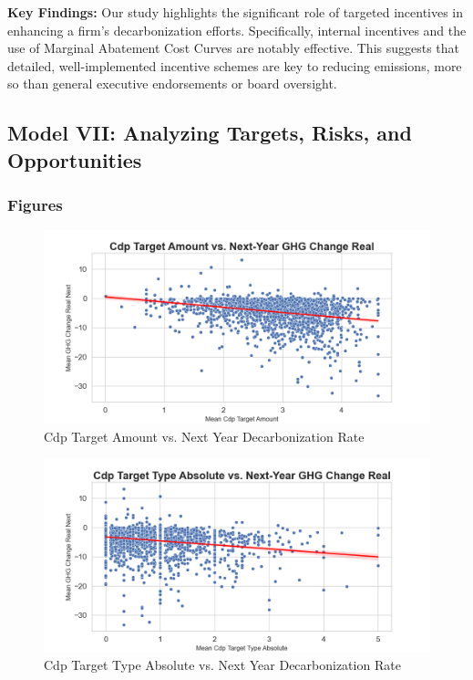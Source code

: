 \textbf{Key Findings:} Our study highlights the significant role of targeted incentives in enhancing a firm's decarbonization efforts. Specifically, internal incentives and the use of Marginal Abatement Cost Curves are notably effective. This suggests that detailed, well-implemented incentive schemes are key to reducing emissions, more so than general executive endorsements or board oversight.




\subsection{Model VII: Analyzing Targets, Risks, and Opportunities}



\subsubsection{Figures}

\begin{figure}[H]
\centering
  \includegraphics[width=\textwidth]{figures/cdp_target_amount_vs_ghg_change_real_next.png}
\caption{Cdp Target Amount vs. Next Year Decarbonization Rate}
\label{fig:cdp_target_amount_vs_ghg_change_real_next}
\end{figure}

\begin{figure}[H]
\centering
  \includegraphics[width=\textwidth]{figures/cdp_target_type_absolute_vs_ghg_change_real_next.png}
\caption{Cdp Target Type Absolute vs. Next Year Decarbonization Rate}
\label{fig:cdp_target_type_absolute_vs_ghg_change_real_next}
\end{figure}

